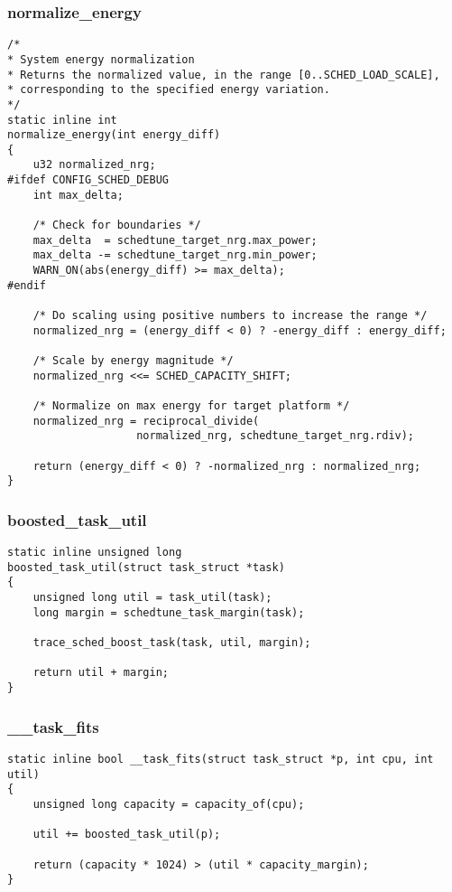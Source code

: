 \documentclass{article}
\begin{document}
\subsubsection{normalize\_energy}

\begin{verbatim}
/*
* System energy normalization
* Returns the normalized value, in the range [0..SCHED_LOAD_SCALE],
* corresponding to the specified energy variation.
*/
static inline int
normalize_energy(int energy_diff)
{
    u32 normalized_nrg;
#ifdef CONFIG_SCHED_DEBUG
    int max_delta;

    /* Check for boundaries */
    max_delta  = schedtune_target_nrg.max_power;
    max_delta -= schedtune_target_nrg.min_power;
    WARN_ON(abs(energy_diff) >= max_delta);
#endif

    /* Do scaling using positive numbers to increase the range */
    normalized_nrg = (energy_diff < 0) ? -energy_diff : energy_diff;

    /* Scale by energy magnitude */
    normalized_nrg <<= SCHED_CAPACITY_SHIFT;

    /* Normalize on max energy for target platform */
    normalized_nrg = reciprocal_divide(
                    normalized_nrg, schedtune_target_nrg.rdiv);

    return (energy_diff < 0) ? -normalized_nrg : normalized_nrg;
}
\end{verbatim}

\subsubsection{boosted\_task\_util}

\begin{verbatim}
static inline unsigned long
boosted_task_util(struct task_struct *task)
{
    unsigned long util = task_util(task);
    long margin = schedtune_task_margin(task);

    trace_sched_boost_task(task, util, margin);

    return util + margin;
}
\end{verbatim}

\subsubsection{\_\_task\_fits}

\begin{verbatim}
static inline bool __task_fits(struct task_struct *p, int cpu, int util)
{
    unsigned long capacity = capacity_of(cpu);

    util += boosted_task_util(p);

    return (capacity * 1024) > (util * capacity_margin);
}
\end{verbatim}
\end{document}
